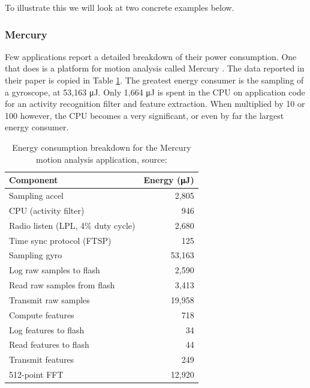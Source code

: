 To illustrate this we will look at two concrete examples below.

\subsubsection{Mercury}
Few applications report a detailed breakdown of their power consumption. One that does is a platform for motion analysis called Mercury \cite{Lorincz:2009kt}. The data reported in their paper is copied in Table \ref{tbl-mercury-energy}. The greatest energy consumer is the sampling of a gyroscope, at 53,163 μJ. Only 1,664 μJ is spent in the CPU on application code for an activity recognition filter and feature extraction. When multiplied by 10 or 100 however, the CPU becomes a very significant, or even by far the largest energy consumer.

\begin{table}
\caption[Energy consumption breakdown for the Mercury motion analysis application]{Energy consumption breakdown for the Mercury motion analysis application, source: \cite{Lorincz:2009kt}}
\label{tbl-mercury-energy}
    \begin{tabular}{lr} %
    \toprule
    Component                          & Energy (μJ) \\
    \midrule
    \midrule
    Sampling accel                     &  2,805 \\
    CPU (activity filter)              &    946 \\
    Radio listen (LPL, 4\% duty cycle) &  2,680 \\
    Time sync protocol (FTSP)          &    125 \\
    Sampling gyro                      & 53,163 \\
    Log raw samples to flash           &  2,590 \\
    Read raw samples from flash        &  3,413 \\
    Transmit raw samples               & 19,958 \\
    \midrule
    Compute features                   &    718 \\
    Log features to flash              &     34 \\
    Read features to flash             &     44 \\
    Transmit features                  &    249 \\
    \midrule
    512-point FFT                      & 12,920 \\
    \bottomrule
    \end{tabular}
\end{table}


